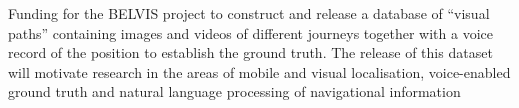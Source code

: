 Funding for the BELVIS project to construct and release a database of ``visual paths'' containing images and videos of different journeys together with a voice record of the position to establish the ground truth. The release of this dataset will motivate research in the areas of mobile and visual localisation, voice-enabled ground truth and natural language processing of navigational information